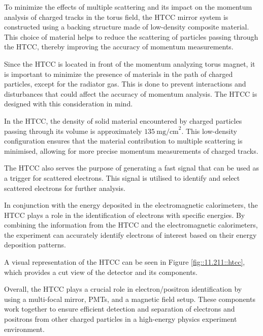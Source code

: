     To minimize the effects of multiple scattering and its impact on the momentum analysis of charged tracks in the torus field, the HTCC mirror system is constructed using a backing structure made of low-density composite material.
    This choice of material helps to reduce the scattering of particles passing through the HTCC, thereby improving the accuracy of momentum measurements.

    Since the HTCC is located in front of the momentum analyzing torus magnet, it is important to minimize the presence of materials in the path of charged particles, except for the radiator gas.
    This is done to prevent interactions and disturbances that could affect the accuracy of momentum analysis.
    The HTCC is designed with this consideration in mind.

    In the HTCC, the density of solid material encountered by charged particles passing through its volume is approximately $135~\text{mg/cm}^2$.
    This low-density configuration ensures that the material contribution to multiple scattering is minimised, allowing for more precise momentum measurements of charged tracks.

    The HTCC also serves the purpose of generating a fast signal that can be used as a trigger for scattered electrons.
    This signal is utilised to identify and select scattered electrons for further analysis.

    In conjunction with the energy deposited in the electromagnetic calorimeters, the HTCC plays a role in the identification of electrons with specific energies.
    By combining the information from the HTCC and the electromagnetic calorimeters, the experiment can accurately identify electrons of interest based on their energy deposition patterns.

    A visual representation of the HTCC can be seen in Figure \ref{fig::11.211::htcc}, which provides a cut view of the detector and its components.

    Overall, the HTCC plays a crucial role in electron/positron identification by using a multi-focal mirror, PMTs, and a magnetic field setup.
    These components work together to ensure efficient detection and separation of electrons and positrons from other charged particles in a high-energy physics experiment environment.
